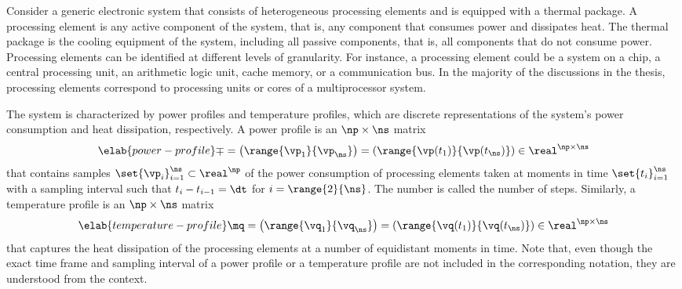 Consider a generic electronic system that consists of \np heterogeneous
processing elements and is equipped with a thermal package. A processing element
is any active component of the system, that is, any component that consumes
power and dissipates heat. The thermal package is the cooling equipment of the
system, including all passive components, that is, all components that do not
consume power. Processing elements can be identified at different levels of
granularity. For instance, a processing element could be a system on a chip,
a central processing unit, an arithmetic logic unit, cache memory, or a
communication bus. In the majority of the discussions in the thesis, processing
elements correspond to processing units or cores of a multiprocessor system.

The system is characterized by power profiles and temperature profiles, which
are discrete representations of the system's power consumption and heat
dissipation, respectively. A power profile is an $\np \times \ns$ matrix
\begin{equation} \elab{power-profile}
  \mp
  = \left(\range{\vp_1}{\vp_\ns}\right)
  = \left(\range{\vp(t_1)}{\vp(t_\ns)}\right) \in \real^{\np \times \ns}
\end{equation}
that contains \ns samples $\set{\vp_i}_{i = 1}^\ns \subset \real^\np$ of the
power consumption of \np processing elements taken at \ns moments in time
$\set{t_i}_{i = 1}^\ns$ with a sampling interval \dt such that $t_i - t_{i - 1}
= \dt$ for $i = \range{2}{\ns}$. The number \ns is called the number of steps.
Similarly, a temperature profile is an $\np \times \ns$ matrix
\begin{equation} \elab{temperature-profile}
  \mq
  = \left(\range{\vq_1}{\vq_\ns}\right)
  = \left(\range{\vq(t_1)}{\vq(t_\ns)}\right) \in \real^{\np \times \ns}
\end{equation}
that captures the heat dissipation of the processing elements at a number of
equidistant moments in time. Note that, even though the exact time frame and
sampling interval of a power profile or a temperature profile are not included
in the corresponding notation, they are understood from the context.
